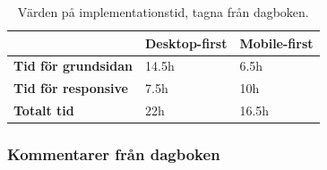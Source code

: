 \documentclass[11pt]{article}
\begin{document}
\begin{table}[H]
	\centering
	\begin{tabular}{|p{6cm}|p{2.7cm}|p{2.4cm}|}
	\hline
	~&\textbf{Desktop-first}&\textbf{Mobile-first}\\ \hline
	\textbf{Tid för grundsidan}&14.5h&6.5h\\ \hline
	\textbf{Tid för responsive}&7.5h&10h\\ \hline
	\textbf{Totalt tid}&22h&16.5h\\ \hline
	\end{tabular}
    \caption {Värden på implementationstid, tagna från dagboken.}
\end{table}

\subsubsection{Kommentarer från dagboken}
\end{document}

